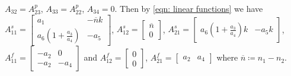 %
$A_{32} = A_{23}^p$,
%
$A_{33} = 
    A_{22}^p$,
%
$A_{34} = 0$.
%
% 
%
%
Then by \eqref{eqn: linear functions} we have
$A_{11}^s = \left[\begin{smallmatrix} a_1 & -\overline{n} k \\ a_6(1+\tfrac{a_3}{a_4}) & -a_5\end{smallmatrix} \right]$, 
$A_{12}^s = \left[\begin{smallmatrix} \overline{n}  \\ 0\end{smallmatrix} \right]$,
$A_{21}^s = \left[\begin{smallmatrix} a_6(1+\tfrac{a_3}{a_4})k & -a_5k \end{smallmatrix} \right]$, 
$A_{11}^f = \left[\begin{smallmatrix} -a_2 & 0 \\ -a_2 & -a_4\end{smallmatrix} \right]$ and
$A_{12}^f = \left[\begin{smallmatrix} 0  \\ 0\end{smallmatrix} \right]$,
$A_{21}^f = \left[\begin{smallmatrix} a_2 & a_4 \end{smallmatrix} \right]$
where
$\overline{n} \coloneqq n_1 - n_2$.
